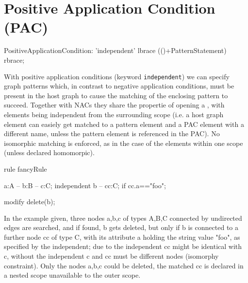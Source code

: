 
	
\section{Positive Application Condition (PAC)}
 \label{pac}

\begin{rail}  
  PositiveApplicationCondition: 
    'independent' lbrace (()+PatternStatement) rbrace;
\end{rail}

With positive application conditions (keyword \texttt{independent}) we can specify graph patterns which, in contrast to negative application conditions, must be present in the host graph to cause the matching of the enclosing pattern to succeed. Together with NACs they share the propertie of opening a , with elements being independent from the surrounding scope (i.e. a host graph element can easiely get matched to a pattern element and a PAC element with a different name, unless the pattern element is referenced in the PAC). 
No isomorphic matching is enforced, as in the case of the elements within one scope (unless declared homomorpic).

\begin{example}
  \begin{grgen}

rule fancyRule
{
  a:A -- b:B -- c:C;
  independent {
    b -- cc:C;
  	if { cc.a=="foo"; }
  }
 
  modify {
    delete(b);
  }
}
  \end{grgen}

In the example given, three nodes a,b,c of types A,B,C connected by undirected edges are searched, and if found, b gets deleted, but only if b is connected to a further node cc of type C, with its attribute a holding the string value "foo", as specified 
by the independent; due to the independent cc might be identical with c, without the independent c and cc must be different nodes (isomorphy constraint). Only the nodes a,b,c could be deleted, the matched cc is declared in a nested scope unavailable to the outer scope.

\end{example}

